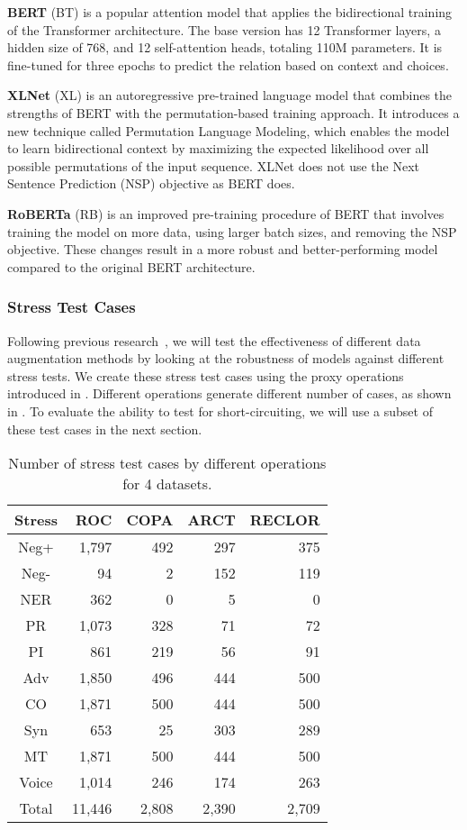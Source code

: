 \textbf{BERT} (BT) is a popular attention model that applies the bidirectional training of the Transformer architecture. The base version has 12 Transformer layers, a hidden size of 768, and 12 self-attention heads, totaling 110M parameters. It is fine-tuned for three epochs to predict the relation based on context and choices.

\textbf{XLNet} (XL) is an autoregressive pre-trained language model that combines the strengths of BERT with the permutation-based training approach. It introduces a new technique called Permutation Language Modeling, which enables the model to learn bidirectional context by maximizing the expected likelihood over all possible permutations of the input sequence. XLNet does not use the Next Sentence Prediction (NSP) objective as BERT does.

\textbf{RoBERTa} (RB) is an improved pre-training procedure of BERT that involves training the model on more data, using larger batch sizes, and removing the NSP objective. These changes result in a more robust and better-performing model compared to the original BERT architecture.

\subsubsection{Stress Test Cases}

Following previous research~\cite{checklist2020acl}, 
we will test the effectiveness of different data augmentation
methods by looking at the robustness of models against
different stress tests.
We create these stress test cases using the proxy operations
introduced in .
Different operations generate different number of cases,
as shown in . To evaluate the
ability to test for short-circuiting, we will
use a subset of these test cases in the next section. 



\begin{table}[th]
\centering
\small
\begin{tabular}{c|rrrr}
\toprule
\textbf{Stress} & \textbf{ROC} & \textbf{COPA} & \textbf{ARCT} & \textbf{RECLOR} \\ \midrule
Neg+  &	1,797&492&	297&375	\\ \hline
Neg-  &	94&	2&	152&	119\\ \hline
NER  &	362&	0&	5&0	\\ \hline
PR  &	1,073&	328&71&72	\\ \hline
PI  &	     861&	219&	56&	91\\ \midrule
Adv  &	1,850&496	&444	&500	\\ \hline
CO  &	1,871&500	&444	&500	\\ \hline
Syn&	653&	 25&	303&289	\\ \midrule
MT  &	1,871&500	&444	&500	\\ \hline
Voice  &	1,014&246	&174	&263	\\ \hline
Total & 11,446  &  2,808 & 2,390 & 2,709 \\ \bottomrule
\end{tabular}
\caption{Number of stress test cases by different operations for 4 datasets.}
\label{tab:cases}
\end{table}
